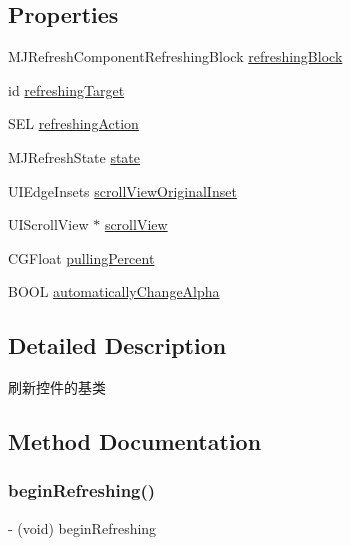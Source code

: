 \subsection*{Properties}
\begin{DoxyCompactItemize}
\item 
M\+J\+Refresh\+Component\+Refreshing\+Block \mbox{\hyperlink{interface_m_j_refresh_component_a1a81cd68250df27bab3e0bf61f61cad1}{refreshing\+Block}}
\item 
id \mbox{\hyperlink{interface_m_j_refresh_component_ae77a62dcdbbcbfb1f84762493878471b}{refreshing\+Target}}
\item 
S\+EL \mbox{\hyperlink{interface_m_j_refresh_component_a7149ab80b77426030967003498951e90}{refreshing\+Action}}
\item 
M\+J\+Refresh\+State \mbox{\hyperlink{interface_m_j_refresh_component_a1a0d3593bf6608b2ef86925ea1186541}{state}}
\item 
U\+I\+Edge\+Insets \mbox{\hyperlink{interface_m_j_refresh_component_a6963761a69ecf895fdd2b3638c8220e0}{scroll\+View\+Original\+Inset}}
\item 
U\+I\+Scroll\+View $\ast$ \mbox{\hyperlink{interface_m_j_refresh_component_ae57aedbc5bf260a3df13b254aee61352}{scroll\+View}}
\item 
C\+G\+Float \mbox{\hyperlink{interface_m_j_refresh_component_ab352260d6f52d90938e6de71d666f37b}{pulling\+Percent}}
\item 
B\+O\+OL \mbox{\hyperlink{interface_m_j_refresh_component_a18a0cd137341313a1ee780aeb87de1ad}{automatically\+Change\+Alpha}}
\end{DoxyCompactItemize}


\subsection{Detailed Description}
刷新控件的基类 

\subsection{Method Documentation}
\mbox{\label{interface_m_j_refresh_component_a0f34a467638a93530b64ae1237785b0a}} 
\subsubsection{\texorpdfstring{begin\+Refreshing()}{beginRefreshing()}\hspace{0.1cm}{\footnotesize\ttfamily [1/3]}}
{\footnotesize\ttfamily -\/ (void) begin\+Refreshing \begin{DoxyParamCaption}{ }\end{DoxyParamCaption}}

